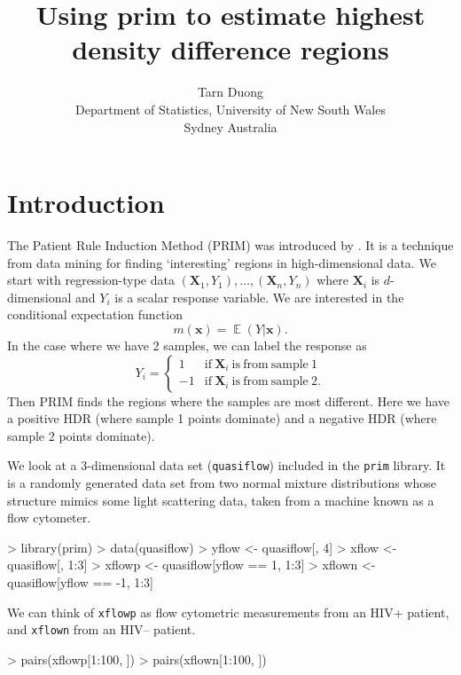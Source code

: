 \documentclass[a4paper,11pt]{article}
\title{Using prim to estimate highest density difference regions}
\author{Tarn Duong \\ Department of Statistics, University of New South Wales \\ Sydney Australia}
\renewcommand{\vec}[1]{\boldsymbol{#1}}
\DeclareMathOperator{\E}{\boldsymbol{\mathbb{E}}}
\def\vecx{\vec{x}}
\def\vecX{\vec{X}}
\begin{document}
\maketitle

\section{Introduction}

The Patient Rule Induction Method (PRIM) was introduced
by \citet*{friedman99}. It is a technique from data mining 
for finding `interesting' regions in high-dimensional data. 
We start with regression-type data $(\vecX_1, Y_1), \dots, (\vecX_n, Y_n)$
where $\vecX_i$ is $d$-dimensional and $Y_i$ is a scalar response variable.
We are interested in the conditional expectation function
$$
m(\vecx) = \E (Y | \vecx).    
$$
In the case where we have 2 samples, we can label the response as 
$$Y_i = \begin{cases} 1 & \mathrm{if} \ \vecX_i \ \mathrm{is \ from \ sample\ 1} \\
 -1 & \mathrm{if} \ \vecX_i \ \mathrm{is \ from \ sample\ 2.}
\end{cases}
$$
Then PRIM finds the regions where the samples are most different. 
Here we have a positive HDR (where sample 1 points dominate)
and a negative HDR (where sample 2 points dominate).

We look at a 3-dimensional data set (\texttt{quasiflow}) included in the
\texttt{prim} library. It is a randomly generated data set from 
two normal mixture distributions whose structure mimics  
some light scattering data, taken from a machine known as a flow cytometer. 
 
\begin{Schunk}
\begin{Sinput}
> library(prim)
> data(quasiflow)
> yflow <- quasiflow[, 4]
> xflow <- quasiflow[, 1:3]
> xflowp <- quasiflow[yflow == 1, 1:3]
> xflown <- quasiflow[yflow == -1, 1:3]
\end{Sinput}
\end{Schunk}
We can think of \texttt{xflowp} as flow cytometric measurements from an
HIV+ patient, and \texttt{xflown} from an HIV-- patient.
\begin{Schunk}
\begin{Sinput}
> pairs(xflowp[1:100, ])
> pairs(xflown[1:100, ])
\end{Sinput}
\end{Schunk}
\end{document}
